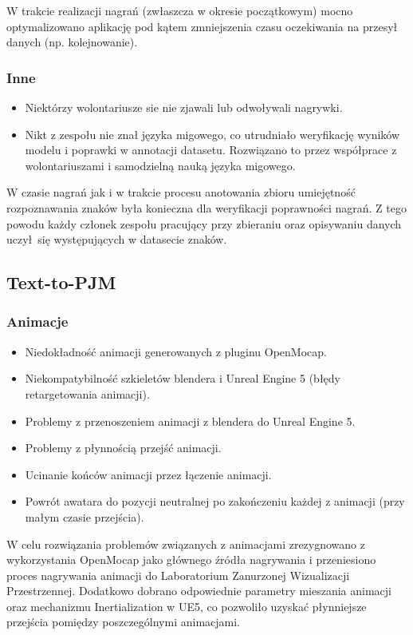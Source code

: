 \documentclass[12pt]{article}
\begin{document}
W trakcie realizacji nagrań (zwłaszcza w okresie początkowym) mocno optymalizowano aplikację pod kątem zmniejszenia czasu oczekiwania na przesył danych (np. kolejnowanie).


\subsubsection{Inne}
\begin{itemize}
    \item Niektórzy wolontariusze sie nie zjawali lub odwoływali nagrywki.
    \item Nikt z zespołu nie znał języka migowego, co utrudniało weryfikację wyników modelu i poprawki w annotacji datasetu. Rozwiązano to przez współprace z wolontariuszami i samodzielną nauką języka migowego.
\end{itemize}

W czasie nagrań jak i w trakcie procesu anotowania zbioru umiejętność rozpoznawania znaków była konieczna dla weryfikacji poprawności nagrań. Z tego powodu każdy członek zespołu pracujący przy zbieraniu oraz opisywaniu danych uczył się występujących w datasecie znaków.

\subsection{Text-to-PJM}

\subsubsection{Animacje}

\begin{itemize}
    \item Niedokładność animacji generowanych z pluginu OpenMocap.
    \item Niekompatybilność szkieletów blendera i Unreal Engine 5 (błędy retargetowania animacji).
    \item Problemy z przenoszeniem animacji z blendera do Unreal Engine 5.
    \item Problemy z płynnością przejść animacji.
    \item Ucinanie końców animacji przez łączenie animacji.
    \item Powrót awatara do pozycji neutralnej po zakończeniu każdej z animacji (przy małym czasie przejścia).
\end{itemize}

W celu rozwiązania problemów związanych z animacjami zrezygnowano z wykorzystania OpenMocap jako głównego źródła nagrywania i przeniesiono proces nagrywania animacji do Laboratorium Zanurzonej Wizualizacji Przestrzennej. Dodatkowo dobrano odpowiednie parametry mieszania animacji oraz mechanizmu Inertialization w UE5, co pozwoliło uzyskać płynniejsze przejścia pomiędzy poszczególnymi animacjami.
\end{document}
